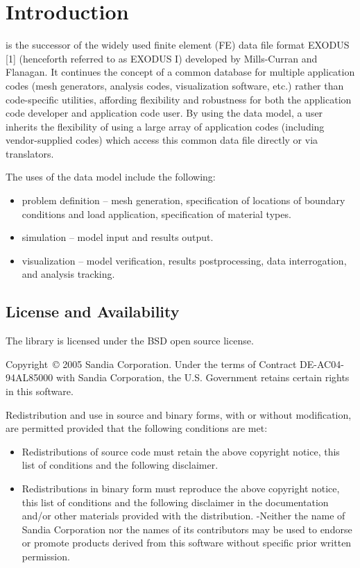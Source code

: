  \chapter{Introduction}

\exo{} is the successor of the widely used finite element 
(FE) data file format EXODUS [1] (henceforth referred to as EXODUS I)
developed by Mills-Curran and Flanagan. It continues the concept of a
common database for multiple application codes (mesh generators,
analysis codes, visualization software, etc.) rather than
code-specific utilities, affording flexibility and robustness for both
the application code developer and application code user. By using the
\exo{} data model, a user inherits the flexibility of using a large
array of application codes (including vendor-supplied codes) which
access this common data file directly or via translators.

The uses of the \exo{} data model include the following:

\begin{itemize}
 \item problem definition -- mesh generation, specification 
of locations of boundary conditions and load application, specification 
of material types.
\item simulation -- model input and results output.
\item visualization -- model verification, results postprocessing, 
data interrogation, and analysis tracking.
\end{itemize}

\section{License and Availability}
The \exo{} library is licensed under the BSD open source license.

Copyright~\copyright{} 2005 Sandia Corporation. Under the terms of
Contract DE-AC04-94AL85000 with Sandia Corporation, the
U.S. Government retains certain rights in this software.

Redistribution and use in source and binary forms, with or without
modification, are permitted provided that the following conditions are
met:
\begin{itemize}
\item Redistributions of source code must retain the above copyright notice,
this list of conditions and the following disclaimer.
\item Redistributions in binary form must reproduce the above copyright
notice, this list of conditions and the following disclaimer in the
documentation and/or other materials provided with the
distribution. -Neither the name of Sandia Corporation nor the names of
its contributors may be used to endorse or promote products derived
from this software without specific prior written permission.
\end{itemize}

